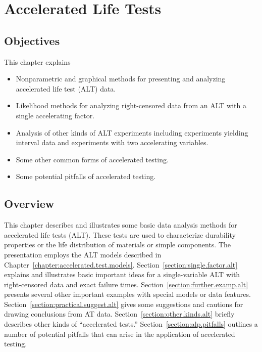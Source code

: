 \setcounter{chapter}{18}

\chapter{Accelerated Life Tests}

\label{chapter:analyzing.alt.data}



\section*{Objectives}
This chapter explains
\begin{itemize} 
\item 
Nonparametric and graphical methods for presenting and analyzing
accelerated life test (ALT) data.
\item 
Likelihood methods for analyzing right-censored data from an ALT
with a single accelerating factor.
\item
Analysis of other kinds of ALT experiments including experiments
yielding interval data and experiments with two accelerating
variables.
\item
Some other common forms of accelerated testing.
\item
Some potential pitfalls of accelerated testing.
\end{itemize}

\section*{Overview}
This chapter describes and illustrates some basic data analysis
methods for accelerated life tests (ALT).  These tests are used to
characterize durability properties or the life distribution of
materials or simple components. The presentation employs the ALT
models described in Chapter~\ref{chapter:accelerated.test.models}.
Section~\ref{section:single.factor.alt} explains and illustrates
basic important ideas for a single-variable ALT with right-censored
data and exact failure times.
Section~\ref{section:further.examp.alt} presents several other
important examples with special models or data features.
Section~\ref{section:practical.suggest.alt} gives some suggestions
and cautions for drawing conclusions from AT data.
Section~\ref{section:other.kinds.alt} briefly describes other kinds
of ``accelerated tests.'' Section~\ref{section:alp.pitfalls} outlines
a number of potential pitfalls that can arise in the application of
accelerated testing.
